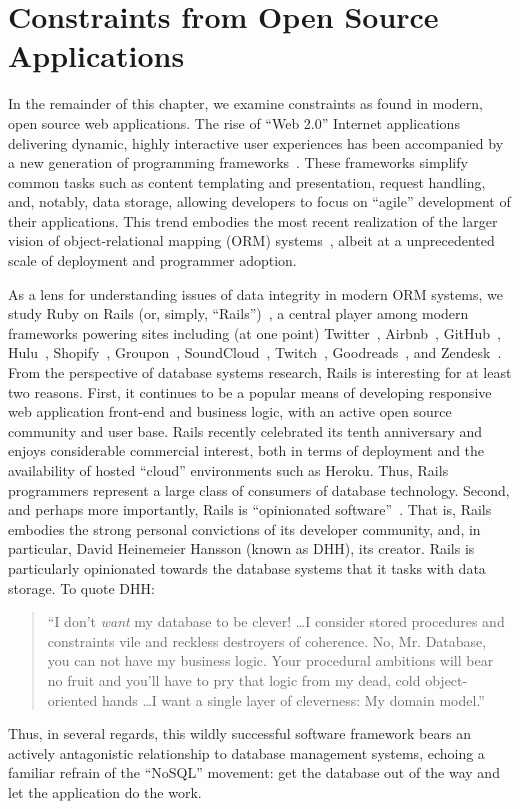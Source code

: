 \section{Constraints from Open Source Applications}
\label{sec:rails-intro}

In the remainder of this chapter, we examine constraints as found in
modern, open source web applications. The rise of ``Web 2.0'' Internet
applications delivering dynamic, highly interactive user experiences
has been accompanied by a new generation of programming
frameworks~\cite{web20}. These frameworks simplify common tasks such
as content templating and presentation, request handling, and,
notably, data storage, allowing developers to focus on ``agile''
development of their applications. This trend embodies the most recent
realization of the larger vision of object-relational mapping (ORM)
systems~\cite{orm-db}, albeit at a unprecedented scale of deployment
and programmer adoption.

As a lens for understanding issues of data integrity in modern ORM
systems, we study Ruby on Rails (or, simply,
``Rails'')~\cite{rails-book,rails-computer}, a central player among
modern frameworks powering sites including (at one point)
Twitter~\cite{twitter-rails}, Airbnb~\cite{airbnb-rails},
GitHub~\cite{github-rails}, Hulu~\cite{hulu-rails},
Shopify~\cite{shopify-rails}, Groupon~\cite{groupon-rails},
SoundCloud~\cite{soundcloud-rails}, Twitch~\cite{twitch-rails},
Goodreads~\cite{goodreads-rails}, and
Zendesk~\cite{zendesk-rails}. From the perspective of database systems
research, Rails is interesting for at least two reasons. First, it
continues to be a popular means of developing responsive web
application front-end and business logic, with an active open source
community and user base. Rails recently celebrated its tenth
anniversary and enjoys considerable commercial interest, both in terms
of deployment and the availability of hosted ``cloud'' environments
such as Heroku. Thus, Rails programmers represent a large class of
consumers of database technology. Second, and perhaps more
importantly, Rails is ``opinionated
software''~\cite{dhh-opinionated}. That is, Rails embodies the strong
personal convictions of its developer community, and, in particular,
David Heinemeier Hansson (known as DHH), its creator. Rails is
particularly opinionated towards the database systems that it tasks
with data storage. To quote DHH:
\begin{quote}
``I don't \textit{want} my database to be clever! \dots I consider stored procedures and constraints vile and reckless destroyers of coherence. No, Mr. Database, you can not have my business logic. Your procedural ambitions will bear no fruit and you'll have to pry that logic from my dead, cold object-oriented hands \dots I want a single layer of cleverness: My domain model.''~\cite{dhh-clever}
\end{quote}
Thus, in several regards, this wildly successful software framework bears
an actively antagonistic relationship to database management systems,
echoing a familiar refrain of the ``NoSQL'' movement: get the database
out of the way and let the application do the work.

